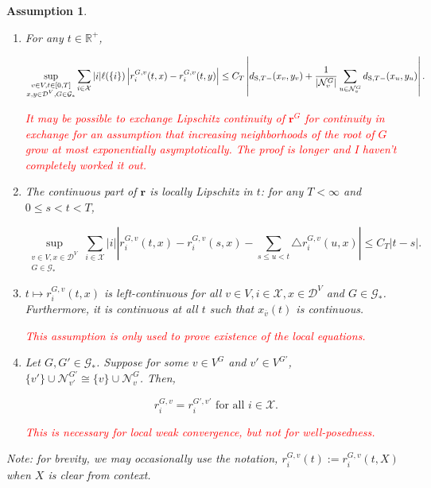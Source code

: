 \documentclass[12pt]{article}
\newcommand{\skipLine}{\vspace{12pt}}
\newcommand{\mb}{\mathbb}
\newcommand{\mc}{\mathcal}
\newcommand{\ov}{\overline}
\newcommand{\te}{\text}
\newcommand{\tr}{\textcolor{red}}
\newcommand{\defeq}{:=}								%
\newcommand{\cad}{\mc{D}}							%
\newcommand{\sta}{\mc{X}}							%
\newcommand{\gneigh}[2]{\mc{N}^{#1}_{#2}}			%
\newcommand{\cl}[1]{\ov{#1}}						%
\newcommand{\Xf}{X}									%
\newcommand{\Sm}{\ell}								%
\newcommand{\rate}{r}								%
\newcommand{\stmet}[1]{
\ifstrempty{#1}{
	d_{\te{S}}}{
	d_{\te{S},#1}}}									%
\newcommand{\xf}{x}									%
\newcommand{\xg}{y}									%
\newcommand{\vind}[1]{_{#1}}						%
\newcommand{\tme}[1]{(#1)}							%
\newcommand{\gind}[1]{^{#1}}						%
\newcommand{\vpara}[1]{^{#1}}						%
\newcommand{\stpara}[1]{_{#1}}						%
\newcommand{\gvpara}[2]{^{#1,#2}}					%
\newcommand{\rateset}{\mathbf{\rate}}				%
\newcommand{\jumpbd}[1]{C_{#1}}						%
\newcommand{\tmepro}[2]{(#1,#2)}					%
\newcommand{\Gs}{\mc{G}_\ast}						%
\newtheorem{assu}[thms]{Assumption}
\begin{document}
\begin{assu}
\begin{enumerate}
\item For any \(t \in \mb{R}^+\),

\begin{equation}
\sup_{\substack{v \in V,t \in [0,T]\\\xf,\xg \in \cad\vpara{V},G \in \Gs}} \sum_{i \in \sta}|i|\Sm(\{i\})\left|\rate\gvpara{G}{v}\stpara{i}\tmepro{t}{\xf} - \rate\gvpara{G}{v}\stpara{i}\tmepro{t}{\xg}\right| \leq \jumpbd{T}\left|\stmet{T-}(\xf\vind{v},\xg\vind{v}) + \frac{1}{|\gneigh{G}{v}|}\sum_{u\in\gneigh{G}{v}} \stmet{T-}(\xf\vind{u},\xg\vind{u})\right|.
\label{a::xLipschitz}
\end{equation}

\tr{It may be possible to exchange Lipschitz continuity of \(\rateset\gind{G}\) for continuity in exchange for an assumption that increasing neighborhoods of the root of \(G\) grow at most exponentially asymptotically. The proof is longer and I haven't completely worked it out.}

\item The continuous part of \(\rateset\) is locally Lipschitz in \(t\): for any \(T < \infty\) and \(0\leq s < t < T\),

\begin{equation}
\sup_{\substack{v \in V,\xf \in \cad^V\\ G \in \Gs}} \sum_{i\in \sta}|i|\left|\rate\gvpara{G}{v}\stpara{i}\tmepro{t}{\xf} - \rate\gvpara{G}{v}\stpara{i}\tmepro{s}{\xf} - \sum_{s\leq u < t} \triangle \rate\gvpara{G}{v}\stpara{i}\tmepro{u}{\xf}\right| \leq \jumpbd{T}\left|t - s\right|.
\label{a::tLipschitz}
\end{equation}

\item \(t\mapsto \rate\gvpara{G}{v}\stpara{i}\tmepro{t}{\xf}\) is left-continuous for all \(v \in V,i\in \sta,\xf\in \cad\vpara{V}\) and \(G \in \Gs\). Furthermore, it is continuous at all \(t\) such that \(\xf\vind{\cl{v}}\tme{t}\) is continuous. 

\tr{This assumption is only used to prove existence of the local equations.}

\item Let \(G,G'\in \Gs\). Suppose for some \(v \in V\gind{G}\) and \(v' \in V\gind{G'}\), \(\{v'\}\cup\gneigh{G'}{v'} \cong \{v\}\cup\gneigh{G}{v}\). Then,

\[\rate\gvpara{G}{v}\stpara{i} = \rate\gvpara{G'}{v'}\stpara{i}\te{ for all } i \in \sta.\]

\tr{This is necessary for local weak convergence, but not for well-posedness.}
\end{enumerate}
\skipLine

Note: for brevity, we may occasionally use the notation, \(\rate\gvpara{G}{v}\stpara{i}\tme{t}\defeq \rate\gvpara{G}{v}\stpara{i}\tmepro{t}{\Xf}\) when \(\Xf\) is clear from context.
\label{a::pbasics}
\end{assu}
\end{document}
